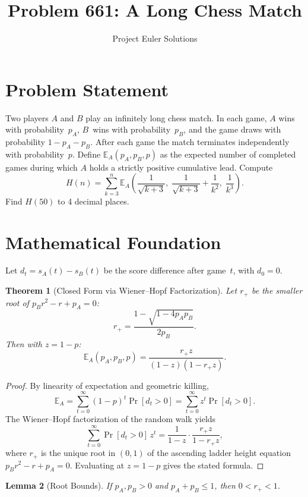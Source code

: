 \documentclass[11pt]{article}
\title{Problem 661: A Long Chess Match}
\author{Project Euler Solutions}
\date{}
\newtheorem{theorem}{Theorem}
\newtheorem{lemma}[theorem]{Lemma}
\begin{document}
\maketitle

\section{Problem Statement}

Two players $A$ and $B$ play an infinitely long chess match. In each game, $A$ wins with probability~$p_A$, $B$~wins with probability~$p_B$, and the game draws with probability $1 - p_A - p_B$. After each game the match terminates independently with probability~$p$. Define $\mathbb{E}_A(p_A, p_B, p)$ as the expected number of completed games during which $A$ holds a strictly positive cumulative lead. Compute
\[
H(n) = \sum_{k=3}^{n} \mathbb{E}_A\!\left(\frac{1}{\sqrt{k+3}},\; \frac{1}{\sqrt{k+3}} + \frac{1}{k^2},\; \frac{1}{k^3}\right).
\]
Find $H(50)$ to 4 decimal places.

\section{Mathematical Foundation}

Let $d_t = s_A(t) - s_B(t)$ be the score difference after game~$t$, with $d_0 = 0$.

\begin{theorem}[Closed Form via Wiener--Hopf Factorization]
\label{thm:closedform}
Let $r_+$ be the smaller root of $p_B r^2 - r + p_A = 0$:
\[
r_+ = \frac{1 - \sqrt{1 - 4p_A p_B}}{2p_B}.
\]
Then with $z = 1 - p$:
\[
\mathbb{E}_A(p_A, p_B, p) = \frac{r_+ z}{(1 - z)(1 - r_+ z)}.
\]
\end{theorem}

\begin{proof}
By linearity of expectation and geometric killing,
\[
\mathbb{E}_A = \sum_{t=0}^{\infty} (1-p)^t \Pr[d_t > 0] = \sum_{t=0}^{\infty} z^t \Pr[d_t > 0].
\]
The Wiener--Hopf factorization of the random walk yields
\[
\sum_{t=0}^{\infty} \Pr[d_t > 0]\, z^t = \frac{1}{1 - z} \cdot \frac{r_+ z}{1 - r_+ z},
\]
where $r_+$ is the unique root in $(0,1)$ of the ascending ladder height equation $p_B r^2 - r + p_A = 0$. Evaluating at $z = 1 - p$ gives the stated formula.
\end{proof}

\begin{lemma}[Root Bounds]
\label{lem:root}
If $p_A, p_B > 0$ and $p_A + p_B \le 1$, then $0 < r_+ < 1$.
\end{lemma}
\end{document}
